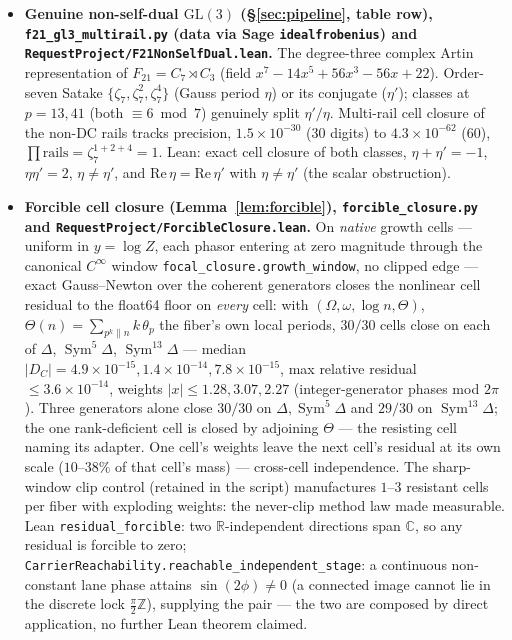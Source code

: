 \documentclass[11pt]{article}
\theoremstyle{definition}
\newcommand{\Sym}{\operatorname{Sym}}
\begin{document}
\begin{itemize}
\item \textbf{Genuine non-self-dual $\mathrm{GL}(3)$ (\S\ref{sec:pipeline}, table row), \texttt{f21\_gl3\_multirail.py} (data via Sage \texttt{idealfrobenius}) and \texttt{RequestProject/F21NonSelfDual.lean}.} The degree-three complex Artin representation of $F_{21}=C_7\rtimes C_3$ (field $x^7-14x^5+56x^3-56x+22$). Order-seven Satake $\{\zeta_7,\zeta_7^2,\zeta_7^4\}$ (Gauss period $\eta$) or its conjugate ($\eta'$); classes at $p=13,41$ (both $\equiv6\bmod7$) genuinely split $\eta'/\eta$. Multi-rail cell closure of the non-DC rails tracks precision, $1.5\times10^{-30}$ (30 digits) to $4.3\times10^{-62}$ (60), $\prod\text{rails}=\zeta_7^{1+2+4}=1$. Lean: exact cell closure of both classes, $\eta+\eta'=-1$, $\eta\eta'=2$, $\eta\ne\eta'$, and $\mathrm{Re}\,\eta=\mathrm{Re}\,\eta'$ with $\eta\ne\eta'$ (the scalar obstruction). 
\item \textbf{Forcible cell closure (Lemma~\ref{lem:forcible}), \texttt{forcible\_closure.py} and \texttt{RequestProject/ForcibleClosure.lean}.} On \emph{native} growth cells --- uniform in $y=\log Z$, each phasor entering at zero magnitude through the canonical $C^{\infty}$ window \texttt{focal\_closure.growth\_window}, no clipped edge --- exact Gauss--Newton over the coherent generators closes the nonlinear cell residual to the float64 floor on \emph{every} cell: with $(\Omega,\omega,\log n,\Theta)$, $\Theta(n)=\sum_{p^k\|n}k\,\theta_p$ the fiber's own local periods, $30/30$ cells close on each of $\Delta$, $\Sym^5\Delta$, $\Sym^{13}\Delta$ --- median $|D_C|=4.9\times10^{-15},1.4\times10^{-14},7.8\times10^{-15}$, max relative residual $\le3.6\times10^{-14}$, weights $|x|\le1.28,3.07,2.27$ (integer-generator phases mod $2\pi$). Three generators alone close $30/30$ on $\Delta,\Sym^5\Delta$ and $29/30$ on $\Sym^{13}\Delta$; the one rank-deficient cell is closed by adjoining $\Theta$ --- the resisting cell naming its adapter. One cell's weights leave the next cell's residual at its own scale ($10$--$38\%$ of that cell's mass) --- cross-cell independence. The sharp-window clip control (retained in the script) manufactures $1$--$3$ resistant cells per fiber with exploding weights: the never-clip method law made measurable. Lean \texttt{residual\_forcible}: two $\mathbb R$-independent directions span $\mathbb C$, so any residual is forcible to zero; \texttt{CarrierReachability.reachable\_independent\_stage}: a continuous non-constant lane phase attains $\sin(2\phi)\neq0$ (a connected image cannot lie in the discrete lock $\tfrac{\pi}{2}\mathbb Z$), supplying the pair --- the two are composed by direct application, no further Lean theorem claimed. 


\end{itemize}
\end{document}
